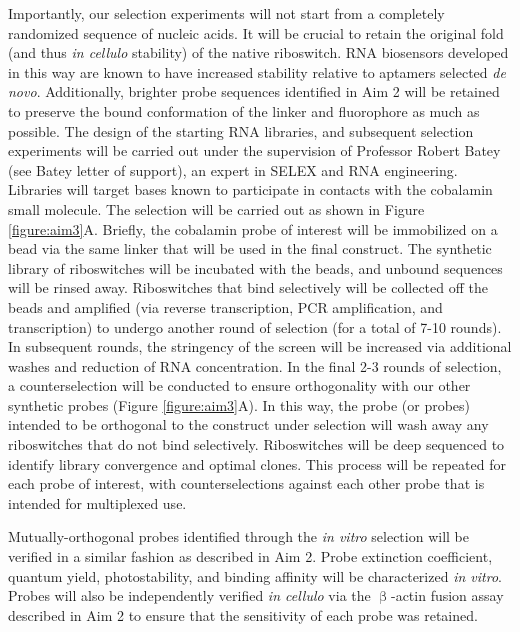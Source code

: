 Importantly, our selection experiments will not start from a completely randomized sequence of nucleic acids. It will be crucial to retain the original fold (and thus \textit{in cellulo} stability) of the native riboswitch. RNA biosensors developed in this way are known to have increased stability relative to aptamers selected \textit{de novo}\cite{PorterRecurrentRNAmotifs2017}.
Additionally, brighter probe sequences identified in Aim 2 will be retained to preserve the bound conformation of the linker and fluorophore as much as possible.
The design of the starting RNA libraries, and subsequent selection experiments will be carried out under the supervision of Professor Robert Batey (see Batey letter of support), an expert in SELEX and RNA engineering\cite{TrauschChapterThreeDesign2015,PorterRecurrentRNAmotifs2017}.
Libraries will target bases known to participate in contacts with the cobalamin small molecule\cite{JohnsonJrB12cofactorsdirectly2012,PorterRecurrentRNAmotifs2017}.
The selection will be carried out as shown in Figure \ref{figure:aim3}A. Briefly, the cobalamin probe of interest will be immobilized on a bead via the same linker that will be used in the final construct.
The synthetic library of riboswitches will be incubated with the beads, and unbound sequences will be rinsed away.
Riboswitches that bind selectively will be collected off the beads and amplified (via reverse transcription, PCR amplification, and transcription) to undergo another round of selection (for a total of 7-10 rounds).
In subsequent rounds, the stringency of the screen will be increased via additional washes and reduction of RNA concentration.
In the final 2-3 rounds of selection, a counterselection will be conducted to ensure orthogonality with our other synthetic probes (Figure \ref{figure:aim3}A). In this way, the probe (or probes) intended to be orthogonal to the construct under selection will wash away any riboswitches that do not bind selectively.
Riboswitches will be deep sequenced to identify library convergence and optimal clones\cite{PorterRecurrentRNAmotifs2017}. This process will be repeated for each probe of interest, with counterselections against each other probe that is intended for multiplexed use.

Mutually-orthogonal probes identified through the \textit{in vitro} selection will be verified in a similar fashion as described in Aim 2. Probe extinction coefficient, quantum yield, photostability, and binding affinity will be characterized \textit{in vitro}. Probes will also be independently verified \textit{in cellulo} via the $\upbeta$-actin fusion assay described in Aim 2 to ensure that the sensitivity of each probe was retained.


